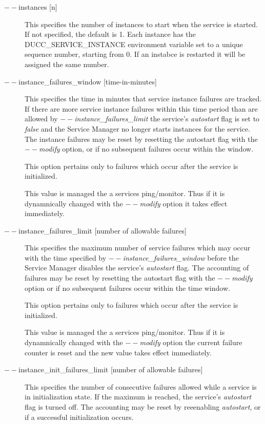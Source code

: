 \begin{description}
         \item[$--$instances {[n]}] This specifies the number of instances to start when the service
           is started.  If not specified, the default is 1.
           Each instance has the DUCC\_SERVICE\_INSTANCE environment variable set to a unique sequence
           number, starting from 0.
           If an instabce is restarted it will be assigned the same number.

        \item[$--$instance\_failures\_window {[time-in-minutes]}]
          This specifies the time in minutes that service instance failures are tracked.   If
          there are more service instance failures within this time period than are allowed
          by {\em$--$instance\_failures\_limit} the service's {\em autostart} flag is set to
          {\em false} and the Service Manager no longer starts instances for the service.
          The instance failures may be reset by resetting the autostart flag with
          the {\em $--$modify} option, or if no subsequent failures occur within the window.

          This option pertains only to failures which occur after the service is initialized.

          This value is managed the a services ping/monitor.  Thus if it is dynamnically changed
          with the {\em $--$modify} option it takes effect immediately.

        \item[$--$instance\_failures\_limit {[number of allowable failures]}]
          This specifies the maximum number of service failures which may occur with the
          time specified by {\em $--$instance\_failures\_window} before the Service Manager
          disables the service's {\em autostart} flag.  The accounting of failures may be
          reset by resetting the autostart flag with the {\em$--$modify} option or if
          no subsequent failures occur within the time window.

          This option pertains only to failures which occur after the service is initialized.

          This value is managed the a services ping/monitor.  Thus if it is dynamnically changed
          with the {\em $--$modify} option the current failure counter is reset and the 
          new value takes effect immediately.

        \item[$--$instance\_init\_failures\_limit {[number of allowable failures]}]
          This specifies the number of consecutive failures allowed while a service is in
          initialization state.   If the maximum is reached, the service's {\em autostart}
          flag is turned off.  The accounting may be reset by reeenabling {\em autostart}, or
          if a successful initialization occurs.


\end{description}
